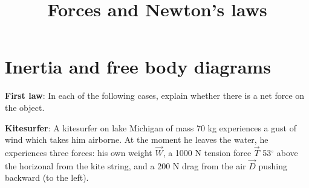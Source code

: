 \documentclass{handout}
\title{Forces and Newton's laws}
\begin{document}
\maketitle
\practiceinstructions

\section{Inertia and free body diagrams}

\begin{questions}
\question \textbf{First law}: In each of the following cases, explain whether there is a net force on the object.
\question \textbf{Kitesurfer}: A kitesurfer on lake Michigan of mass 70 kg experiences a gust of wind which takes him airborne. At the moment he leaves the water, he experiences three forces: his own weight $\vec{W}$, a 1000 N tension force $\vec{T}$ 53$^\circ$ above the horizonal from the kite string, and a 200 N drag from the air $\vec{D}$ pushing backward (to the left).  
\end{questions}
\end{document}
